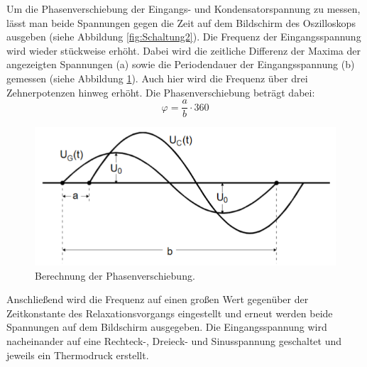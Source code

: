 Um die Phasenverschiebung der Eingangs- und Kondensatorspannung zu messen,
lässt man beide Spannungen gegen die Zeit auf dem Bildschirm des Oszilloskops ausgeben (siehe Abbildung \ref{fig:Schaltung2}).
Die Frequenz der Eingangsspannung wird wieder stückweise erhöht. Dabei wird
die zeitliche Differenz der Maxima der angezeigten Spannungen (a) sowie die Periodendauer der Eingangsspannung (b)
gemessen (siehe Abbildung \ref{fig:Rechnung}).
Auch hier wird die Frequenz über drei Zehnerpotenzen hinweg erhöht. Die Phasenverschiebung beträgt dabei:
\begin{equation}
  \varphi = \frac{a}{b} \cdot 360
\end{equation}
\begin{figure}[H]
  \centering
  \includegraphics[width=14cm]{Rechnung.PNG}
  \caption{Berechnung der Phasenverschiebung. \cite{sample}}
  \label{fig:Rechnung}
\end{figure}

Anschließend wird die Frequenz auf einen großen Wert gegenüber der Zeitkonstante
des Relaxationsvorgangs eingestellt und erneut werden beide Spannungen auf dem
Bildschirm ausgegeben. Die Eingangsspannung wird nacheinander auf eine Rechteck-, Dreieck-
und Sinusspannung geschaltet und jeweils ein Thermodruck erstellt.
